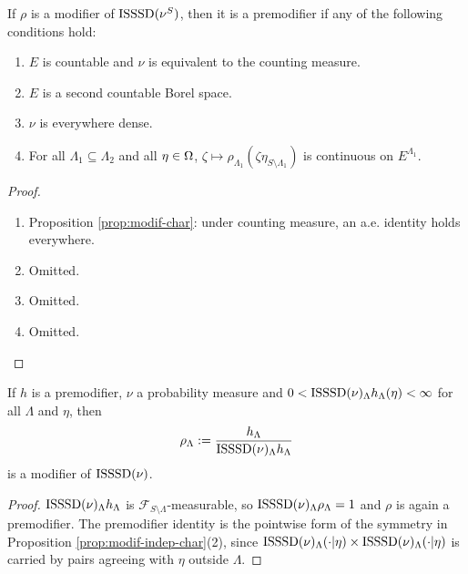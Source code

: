 \begin{lemma}
    \label{lem:modif-premodif}
    If $\rho$ is a modifier of $\operatorname{ISSSD}(\nu^S)$, then it is a premodifier if any of the following conditions hold:
    \begin{enumerate}
        \item $E$ is countable and $\nu$ is equivalent to the counting measure.
        \item $E$ is a second countable Borel space.
        \item $\nu$ is everywhere dense.
        \item For all $\Lambda_1 \subseteq \Lambda_2$ and all $\eta \in \Omega$, $\zeta \mapsto \rho_{\Lambda_1}(\zeta \eta_{S \setminus \Lambda_1})$ is continuous on $E^{\Lambda_1}$.
    \end{enumerate}
\end{lemma}
\begin{proof}

    \begin{enumerate}
        \item Proposition \ref{prop:modif-char}: under counting measure, an a.e. identity holds
        everywhere.
        \item Omitted.
        \item Omitted.
        \item Omitted.
    \end{enumerate}
\end{proof}

\begin{lemma}
    \label{lem:premodif-modif}
    \leanok
    If $h$ is a premodifier, $\nu$ a probability measure and
    $0 < \operatorname{ISSSD}(\nu)_\Lambda h_\Lambda(\eta) < \infty$ for all $\Lambda$ and $\eta$, then
    $$\rho_\Lambda := \frac{h_\Lambda}{\operatorname{ISSSD}(\nu)_\Lambda h_\Lambda}$$
    is a modifier of $\operatorname{ISSSD}(\nu)$.
\end{lemma}
\begin{proof}

    $\operatorname{ISSSD}(\nu)_\Lambda h_\Lambda$ is $\mathcal{F}_{S\setminus\Lambda}$-measurable, so
    $\operatorname{ISSSD}(\nu)_\Lambda\rho_\Lambda = 1$ and $\rho$ is again a premodifier. The premodifier
    identity is the pointwise form of the symmetry in
    Proposition \ref{prop:modif-indep-char}(2), since
    $\operatorname{ISSSD}(\nu)_\Lambda(\cdot|\eta) \times \operatorname{ISSSD}(\nu)_\Lambda(\cdot|\eta)$ is carried by pairs
    agreeing with $\eta$ outside $\Lambda$.
\end{proof}
